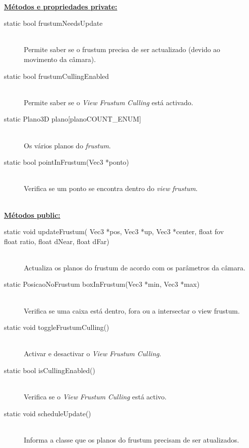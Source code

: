 \documentclass[a5paper,onecolumn, 11pt]{article}
\begin{document}
\hfill \\ \underline{\textbf{Métodos e propriedades private:}}

\begin{description}
	\item[static bool frustumNeedsUpdate] \hfill \\
	Permite saber se o frustum precisa de ser actualizado (devido ao movimento da câmara).

	\item[static bool frustumCullingEnabled] \hfill \\
	Permite saber se o \textit{View Frustum Culling} está activado.

	\item[static Plano3D plano{[planoCOUNT\_ENUM]}] \hfill \\
	Os vários planos do \textit{frustum}.

	\item[static bool pointInFrustum(Vec3 *ponto)] \hfill \\
	Verifica se um ponto se encontra dentro do \textit{view frustum}.
\end{description}

\hfill \\ \underline{\textbf{Métodos public:}}

\begin{description}
	\item[static void updateFrustum( Vec3 *pos, Vec3 *up, Vec3 *center, float fov]
	\item[float ratio, float dNear, float dFar)] \hfill \\
	Actualiza os planos do frustum de acordo com os parâmetros da câmara.

	\item[static PosicaoNoFrustum boxInFrustum(Vec3 *min, Vec3 *max)] \hfill \\
	Verifica se uma caixa está dentro, fora ou a intersectar o view frustum.

	\item[static void toggleFrustumCulling()] \hfill \\
	Activar e desactivar o \textit{View Frustum Culling}.

	\item[static bool isCullingEnabled()] \hfill \\
	Verifica se o \textit{View Frustum Culling} está activo.

	\item[static void scheduleUpdate()] \hfill \\
	Informa a classe que os planos do frustum precisam de ser atualizados.
\end{description}
\end{document}
